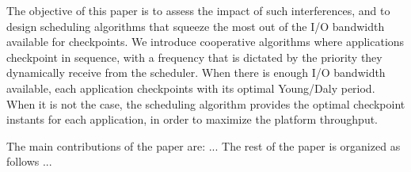 \documentclass{article}
\begin{document}
The objective of this paper is to assess the impact of such interferences, and to design scheduling algorithms that squeeze the most out of the I/O bandwidth available for checkpoints. We introduce cooperative algorithms where applications checkpoint in sequence, with a frequency that
is dictated by the priority they dynamically receive from the scheduler. When there is enough I/O bandwidth available, each application checkpoints with its optimal Young/Daly period. When it is not the case, the scheduling algorithm provides the optimal checkpoint instants for each application, in order to maximize the platform throughput.

The main contributions of the paper are: ...
The rest of the paper is organized as follows ...

% 
%
\end{document}
